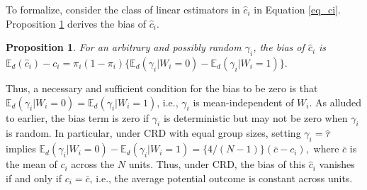 \documentclass[12pt]{article}
\newcommand{\E}{{\mathbb{E}}}
\newtheorem{proposition}[theorem]{Proposition}
\begin{document}
To formalize, consider the class of linear estimators in $\hat{c}_i$ in Equation \ref{eq_ci}. Proposition \ref{prop_bias} derives the bias of $\hat{c}_i$.
\begin{proposition} \normalfont
For an arbitrary and possibly random $\gamma_i$, the bias of $\hat{c}_i$ is $\E_d(\hat{c}_i) - c_i  = \pi_i(1-\pi_i)\{\E_d(\gamma_i|W_i = 0) - \E_d(\gamma_i|W_i = 1)\}.$
\label{prop_bias}
\end{proposition}
Thus, a necessary and sufficient condition for the bias to be zero is that $\E_d(\gamma_i|W_i = 0) = \E_d(\gamma_i|W_i = 1)$, i.e., $\gamma_i$ is mean-independent of $W_i$.
As alluded to earlier, the bias term is zero if $\gamma_i$ is deterministic but may not be zero when $\gamma_i$ is random. In particular, under CRD with equal group sizes, setting $\gamma_i = \hat{\tau}$ implies $\E_d(\gamma_i|W_i = 0) - \E_d(\gamma_i|W_i = 1) = \{4/(N-1)\}(\bar{c} - c_i),$ where $\bar{c}$ is the mean of $c_i$ across the $N$ units. Thus, under CRD, the bias of this $\hat{c}_i$ vanishes if and only if $c_i = \bar{c}$, i.e., the average potential outcome is constant across units.   
\end{document}
